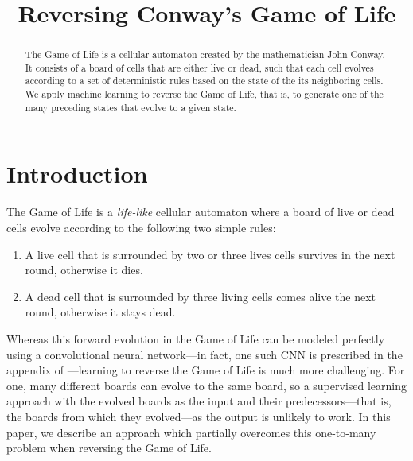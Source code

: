 \documentclass[conference]{IEEEtran}
\begin{document}
\title{Reversing Conway's Game of Life}

\author{
\and
{}
\and
{}
}

\maketitle

\begin{abstract}
The Game of Life \cite{b2} is a cellular automaton created by the mathematician John Conway. It consists of a board of cells that are either live or dead, such that each cell evolves according to a set of deterministic rules  based on the state of the its neighboring cells. We apply machine learning to reverse the Game of Life, that is, to generate one of the many preceding states that evolve to a given state.
\end{abstract}

\section{Introduction}
The Game of Life is a \emph{life-like} cellular automaton \cite{lifelike} where a board of live or dead cells evolve according to the following two simple rules:
\begin{enumerate}
    \item A live cell that is surrounded by two or three lives cells survives in the next round, otherwise it dies.
    \item A dead cell that is surrounded by three living cells comes alive the next round, otherwise it stays dead.
\end{enumerate}
Whereas this forward evolution in the Game of Life can be modeled perfectly using a convolutional neural network---in fact, one such CNN is prescribed in the appendix of  \cite{b5}---learning to reverse the Game of Life is much more challenging. For one, many different boards can evolve to the same board, so a supervised learning approach with the evolved boards as the input and their predecessors---that is, the boards from which they evolved---as the output is unlikely to work. In this paper, we describe an approach which partially overcomes this one-to-many problem when reversing the Game of Life.
\end{document}
